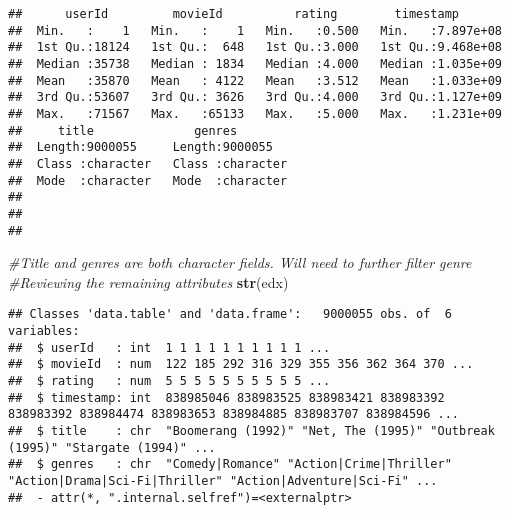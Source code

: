 \documentclass[
]{article}
\newenvironment{Shaded}{\begin{snugshade}}{\end{snugshade}}
\newcommand{\CommentTok}[1]{\textcolor[rgb]{0.56,0.35,0.01}{\textit{#1}}}
\newcommand{\DecValTok}[1]{\textcolor[rgb]{0.00,0.00,0.81}{#1}}
\newcommand{\KeywordTok}[1]{\textcolor[rgb]{0.13,0.29,0.53}{\textbf{#1}}}
\newcommand{\NormalTok}[1]{#1}
\newcommand{\OperatorTok}[1]{\textcolor[rgb]{0.81,0.36,0.00}{\textbf{#1}}}
\newcommand{\StringTok}[1]{\textcolor[rgb]{0.31,0.60,0.02}{#1}}
\begin{document}
\begin{verbatim}
##      userId         movieId          rating        timestamp        
##  Min.   :    1   Min.   :    1   Min.   :0.500   Min.   :7.897e+08  
##  1st Qu.:18124   1st Qu.:  648   1st Qu.:3.000   1st Qu.:9.468e+08  
##  Median :35738   Median : 1834   Median :4.000   Median :1.035e+09  
##  Mean   :35870   Mean   : 4122   Mean   :3.512   Mean   :1.033e+09  
##  3rd Qu.:53607   3rd Qu.: 3626   3rd Qu.:4.000   3rd Qu.:1.127e+09  
##  Max.   :71567   Max.   :65133   Max.   :5.000   Max.   :1.231e+09  
##     title              genres         
##  Length:9000055     Length:9000055    
##  Class :character   Class :character  
##  Mode  :character   Mode  :character  
##                                       
##                                       
## 
\end{verbatim}

\begin{Shaded}
\begin{Highlighting}[]
\CommentTok{#Title and genres are both character fields. Will need to further filter genre}
\CommentTok{#Reviewing the remaining attributes}
\KeywordTok{str}\NormalTok{(edx)}
\end{Highlighting}
\end{Shaded}

\begin{verbatim}
## Classes 'data.table' and 'data.frame':   9000055 obs. of  6 variables:
##  $ userId   : int  1 1 1 1 1 1 1 1 1 1 ...
##  $ movieId  : num  122 185 292 316 329 355 356 362 364 370 ...
##  $ rating   : num  5 5 5 5 5 5 5 5 5 5 ...
##  $ timestamp: int  838985046 838983525 838983421 838983392 838983392 838984474 838983653 838984885 838983707 838984596 ...
##  $ title    : chr  "Boomerang (1992)" "Net, The (1995)" "Outbreak (1995)" "Stargate (1994)" ...
##  $ genres   : chr  "Comedy|Romance" "Action|Crime|Thriller" "Action|Drama|Sci-Fi|Thriller" "Action|Adventure|Sci-Fi" ...
##  - attr(*, ".internal.selfref")=<externalptr>
\end{verbatim}

\begin{Shaded}
\end{Shaded}
\end{document}
